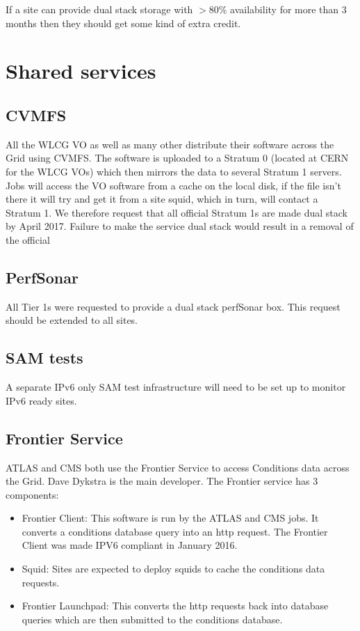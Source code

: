 If a site can provide dual stack storage with $> 80\%$ availability for more than 3 months then they should get some kind of extra credit.



\section{Shared services}
\subsection{CVMFS}
All the WLCG VO as well as many other distribute their software across the Grid using CVMFS. The software is uploaded to a Stratum 0 (located at CERN for the WLCG VOs) which then mirrors the data to several Stratum 1 servers.  Jobs will access the VO software from a cache on the local disk, if the file isn't there it will try and get it from a site squid, which in turn, will contact a Stratum 1.  We therefore request that all official Stratum 1s \cite{Stratum1} are made dual stack by April 2017.  Failure to make the service dual stack would result in a removal of the official 

\subsection{PerfSonar}
All Tier 1s were requested to provide a dual stack perfSonar box.  This request should be extended to all sites.

\subsection{SAM tests}
A separate IPv6 only SAM test infrastructure will need to be set up to monitor IPv6 ready sites.

\subsection{Frontier Service}
ATLAS and CMS both use the Frontier Service\cite{Frontier} to access Conditions data across the Grid.  Dave Dykstra is the main developer.  The Frontier service has 3 components:
\begin{itemize}
\item Frontier Client: This software is run by the ATLAS and CMS jobs.  It converts a conditions database query into an http request.  The Frontier Client was made IPV6 compliant in January 2016.

\item Squid: Sites are expected to deploy squids to cache the conditions data requests.

\item Frontier Launchpad: This converts the http requests back into database queries which are then submitted to the conditions database.

\end{itemize}

